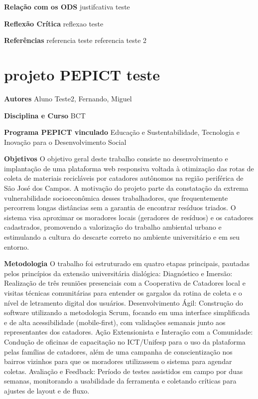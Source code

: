 \documentclass[12pt,openright,oneside,a4paper]{report}
\begin{document}
\vspace{0.7cm}
\noindent
\textbf{Relação com os ODS}
justifcativa teste

\vspace{0.7cm}
\noindent
\textbf{Reflexão Crítica}
reflexao teste

\vspace{0.7cm}
\noindent
\textbf{Referências}
referencia teste
referencia teste 2

\vspace{0.7cm}
\section{projeto PEPICT teste}
\noindent
\textbf{Autores}
Aluno Teste2, Fernando, Miguel

\vspace{0.7cm}
\noindent
\textbf{Disciplina e Curso}
BCT

\vspace{0.7cm}
\noindent
\textbf{Programa PEPICT vinculado}
Educação e Sustentabilidade, Tecnologia e Inovação para o Desenvolvimento Social

\vspace{0.7cm}
\noindent
\textbf{Objetivos}
O objetivo geral deste trabalho consiste no desenvolvimento e implantação de uma plataforma web
responsiva voltada à otimização das rotas de coleta de materiais recicláveis por catadores autônomos
na região periférica de São José dos Campos. A motivação do projeto parte da constatação da extrema
vulnerabilidade socioeconômica desses trabalhadores, que frequentemente percorrem longas distâncias
sem a garantia de encontrar resíduos triados. O sistema visa aproximar os moradores locais (geradores
de resíduos) e os catadores cadastrados, promovendo a valorização do trabalho ambiental urbano e
estimulando a cultura do descarte correto no ambiente universitário e em seu entorno.

\vspace{0.7cm}
\noindent
\textbf{Metodologia}
O trabalho foi estruturado em quatro etapas principais, pautadas pelos princípios da extensão
universitária dialógica:
Diagnóstico e Imersão: Realização de três reuniões presenciais com a Cooperativa de Catadores
local e visitas técnicas comunitárias para entender os gargalos da rotina de coleta e o nível de
letramento digital dos usuários.
Desenvolvimento Ágil: Construção do software utilizando a metodologia Scrum, focando em uma
interface simplificada e de alta acessibilidade (mobile-first), com validações semanais junto aos
representantes dos catadores.
Ação Extensionista e Interação com a Comunidade: Condução de oficinas de capacitação no
ICT/Unifesp para o uso da plataforma pelas famílias de catadores, além de uma campanha de
conscientização nos bairros vizinhos para que os moradores utilizassem o sistema para agendar
coletas.
Avaliação e Feedback: Período de testes assistidos em campo por duas semanas, monitorando a
usabilidade da ferramenta e coletando críticas para ajustes de layout e de fluxo.
\end{document}
